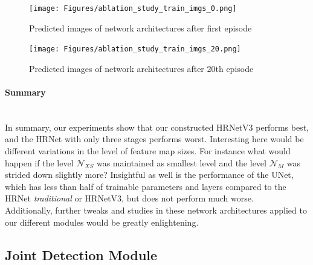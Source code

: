 \begin{figure}[H]
    \centering
    \texttt{[image: Figures/ablation\_study\_train\_imgs\_0.png]}
    \decoRule
    \caption[Ablation Human Parts Module: 1st Episode Predictions]{Predicted images of network architectures after first
    episode}
    \label{fig:train-img-0}
\end{figure}
\begin{figure}[H]
    \centering
    \texttt{[image: Figures/ablation\_study\_train\_imgs\_20.png]}
    \decoRule
    \caption[Ablation Human Parts Module: 20th Episode Predictions]{Predicted images of network architectures after 20th
    episode}
    \label{fig:train-img-20}
\end{figure}

\paragraph{Summary}\mbox{}\\
In summary, our experiments show that our constructed HRNetV3 performs best, and the HRNet with only three stages performs
worst.
Interesting here would be different variations in the level of feature map sizes.
For instance what would happen if the level $\mathcal{N}_{XS}$ was maintained as smallest level and the level
$\mathcal{N}_M$ was strided down slightly more?
Insightful as well is the performance of the UNet, which has less than half of trainable parameters and layers compared to
the HRNet \textit{traditional} or HRNetV3, but does not perform much worse.\\
Additionally, further tweaks and studies in these network architectures applied to our different modules would be
greatly enlightening.


\subsection{Joint Detection Module }

